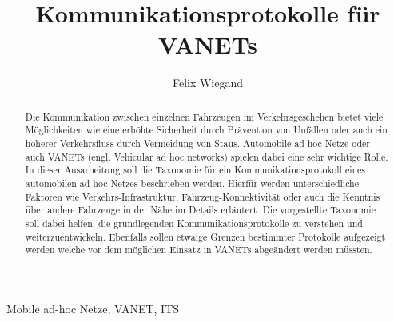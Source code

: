 \documentclass[english,runningheads,a4paper]{llncs}[2018/03/10]
\begin{document}
\title{Kommunikationsprotokolle für VANETs}

\author{Felix Wiegand}

%
%

\maketitle

\begin{abstract}
  Die Kommunikation zwischen einzelnen Fahrzeugen im Verkehrsgeschehen bietet viele Möglichkeiten wie eine erhöhte Sicherheit durch Prävention von Unfällen oder auch ein höherer Verkehrsfluss durch Vermeidung von Staus.
  Automobile ad-hoc Netze oder auch VANETs (engl. Vehicular ad hoc networks) spielen dabei eine sehr wichtige Rolle.
  In dieser Ausarbeitung soll die Taxonomie für ein Kommunikationsprotokoll eines automobilen ad-hoc Netzes beschrieben werden.
  Hierfür werden unterschiedliche Faktoren wie Verkehrs-Infrastruktur, Fahrzeug-Konnektivität oder auch die Kenntnis über andere Fahrzeuge in der Nähe im Details erläutert.
  Die vorgestellte Taxonomie soll dabei helfen, die grundlegenden Kommunikationsprotokolle zu verstehen und weiterzuentwickeln.
  Ebenfalls sollen etwaige Grenzen bestimmter Protokolle aufgezeigt werden welche vor dem möglichen Einsatz in VANETs abgeändert werden müssten\cite{conti2013mobile}.
\end{abstract}

\begin{keywords}
  Mobile ad-hoc Netze, VANET, ITS
\end{keywords}
\end{document}
